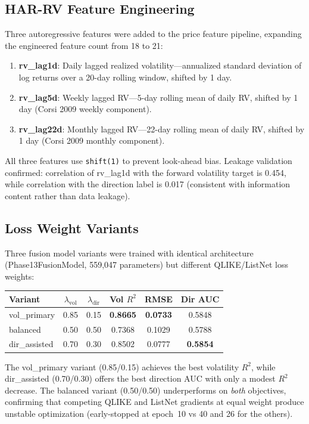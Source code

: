 \documentclass[12pt,a4paper]{article}
\begin{document}
\subsection{HAR-RV Feature Engineering}
Three autoregressive features were added to the price feature pipeline, expanding the
engineered feature count from 18 to 21:
\begin{enumerate}
    \item \textbf{rv\_lag1d}: Daily lagged realized volatility---annualized standard
          deviation of log returns over a 20-day rolling window, shifted by 1 day.
    \item \textbf{rv\_lag5d}: Weekly lagged RV---5-day rolling mean of daily RV,
          shifted by 1 day (Corsi 2009 weekly component).
    \item \textbf{rv\_lag22d}: Monthly lagged RV---22-day rolling mean of daily RV,
          shifted by 1 day (Corsi 2009 monthly component).
\end{enumerate}
All three features use \texttt{shift(1)} to prevent look-ahead bias.  Leakage
validation confirmed: correlation of rv\_lag1d with the forward volatility target
is 0.454, while correlation with the direction label is 0.017 (consistent with
information content rather than data leakage).

\subsection{Loss Weight Variants}
Three fusion model variants were trained with identical architecture
(Phase13FusionModel, 559,047 parameters) but different QLIKE/ListNet loss weights:
\begin{center}
\begin{tabular}{lccccc}
\toprule
\textbf{Variant} & $\lambda_{\text{vol}}$ & $\lambda_{\text{dir}}$ &
\textbf{Vol $R^2$} & \textbf{RMSE} & \textbf{Dir AUC} \\
\midrule
vol\_primary   & 0.85 & 0.15 & \textbf{0.8665} & \textbf{0.0733} & 0.5848 \\
balanced       & 0.50 & 0.50 & 0.7368 & 0.1029 & 0.5788 \\
dir\_assisted  & 0.70 & 0.30 & 0.8502 & 0.0777 & \textbf{0.5854} \\
\bottomrule
\end{tabular}
\end{center}
The vol\_primary variant (0.85/0.15) achieves the best volatility $R^2$,
while dir\_assisted (0.70/0.30) offers the best direction AUC with only a modest
$R^2$ decrease.  The balanced variant (0.50/0.50) underperforms on \emph{both}
objectives, confirming that competing QLIKE and ListNet gradients at equal weight
produce unstable optimization (early-stopped at epoch~10 vs 40 and 26 for the others).
\end{document}
